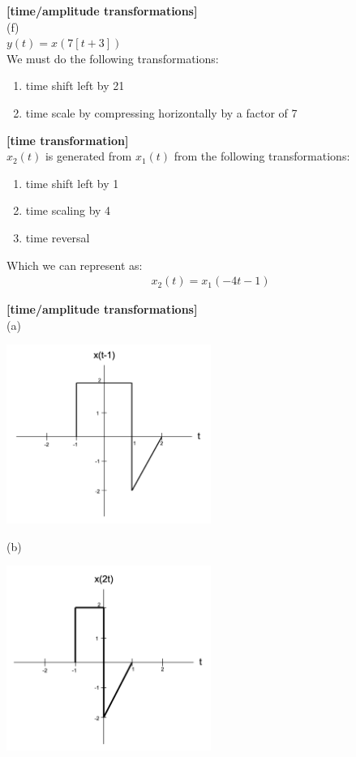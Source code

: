 \documentclass{article}
\begin{document}
 {\bf [time/amplitude transformations]}\\
(f)\\
$y(t) = x(7[t + 3])$\\
We must do the following transformations:
\begin{enumerate}
  \item  time shift left by 21
  \item time scale by compressing horizontally by a factor of 7
\end{enumerate}  
  
  
 {\bf [time transformation]}\\
$x_2(t)$ is generated from $x_1(t)$ from the following transformations:
\begin{enumerate}
  \item time shift left by 1
  \item time scaling by 4
  \item time reversal
\end{enumerate}  
Which we can represent as:
\begin{equation*}
\begin{split}
    x_2(t) = x_1(-4t - 1)
\end{split}
\end{equation*}


 {\bf [time/amplitude transformations]}\\
(a)
\begin{center}
    \includegraphics[width=0.5\textwidth]{34a.png}
\end{center}

(b)
\begin{center}
    \includegraphics[width=0.5\textwidth]{34b.png}
\end{center}
\end{document}
